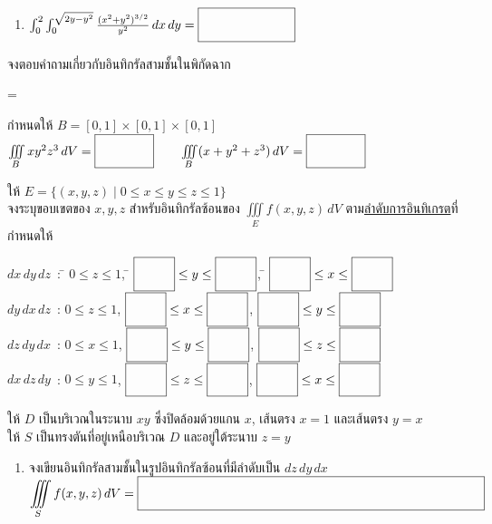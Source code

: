 \documentclass[12pt,final]{novelette} %
\begin{document}
\begin{question}
\begin{question}
\begin{enumerate}[label=(\alph*),itemsep=12pt,topsep=5pt]
            \item $\int_0^2 \int_0^{\sqrt{2y - y^2}} \frac {(x^2 + y^2)^{3/2}} {y^2} \, d x \, d y = \ansbox$
        \end{enumerate}
    \end{question}

    \pagebreak

    \item {} %
     จงตอบคำถามเกี่ยวกับอินทิกรัลสามชั้นในพิกัดฉาก
    \begin{question}
        \everymath={\displaystyle}
        \item กำหนดให้ $B = [0, 1] \times [0, 1] \times [0, 1]$ \\[1em]
        $\iiint\limits_B x y^2 z^3 \, d V = \ansboxs \qquad \iiint\limits_B (x + y^2 + z^3) \, d V = \ansboxs$

        \vspace{2.8em}

        \item ให้ $E = \{(x, y, z) \mid 0 \leq x \leq y \leq z \leq 1\}$ \\[.5em]
        จงระบุขอบเขตของ $x, y, z$ สำหรับอินทิกรัลซ้อนของ $\iiint\limits_E f(x, y, z) \, d V$ ตาม\uline{ลำดับการอินทิเกรต}ที่กำหนดให้

        \def\tb#1{$\ansboxi{0.9cm} \leq #1 \leq \ansboxi{0.9cm}$}
        \begin{tabbing}
            $dx \, dy \, dz$\ : \quad \= $0 \leq z \leq 1$, \quad \= \tb{y}, \quad \= \tb{x} \\[0.8em]
            $dy \, dx \, dz$\ : \quad \> $0 \leq z \leq 1$, \quad \> \tb{x}, \quad \> \tb{y} \\[0.8em]
            $dz \, dy \, dx$\ : \quad \> $0 \leq x \leq 1$, \quad \> \tb{y}, \quad \> \tb{z} \\[0.8em]
            $dx \, dz \, dy$\ : \quad \> $0 \leq y \leq 1$, \quad \> \tb{z}, \quad \> \tb{x}
        \end{tabbing}

        \vspace{1.8em}

        \item ให้ $D$ เป็นบริเวณในระนาบ $xy$ ซึ่งปิดล้อมด้วยแกน $x$, เส้นตรง $x = 1$ และเส้นตรง $y = x$ \\
        ให้ $S$ เป็นทรงตันที่อยู่เหนือบริเวณ $D$ และอยู่ใต้ระนาบ $z = y$

        \medskip
        \begin{enumerate}[label=(\alph*),itemsep=15pt,topsep=5pt]
            \item จงเขียนอินทิกรัลสามชั้นในรูปอินทิกรัลซ้อนที่มีลำดับเป็น $dz \, dy \, dx$ \\[1em]
                  $\displaystyle \iiint\limits_S f(x, y, z) \, d V = \ansboxi{9.5cm}$


\end{enumerate}
\end{question}
\end{question}
\end{document}

